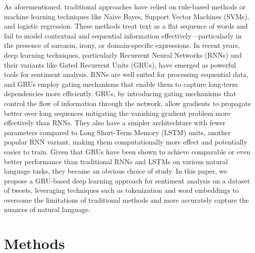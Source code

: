 \documentclass[11pt]{article}
\begin{document}
As aforementioned, traditional approaches have relied on rule-based methods or machine learning techniques like Naive Bayes, Support Vector Machines (SVMs), and logistic regression. These methods treat text as a flat sequence of words and fail to model contextual and sequential information effectively—particularly in the presence of sarcasm, irony, or domain-specific expressions. In recent years, deep learning techniques, particularly Recurrent Neural Networks (RNNs) and their variants like Gated Recurrent Units (GRUs), have emerged as powerful tools for sentiment analysis. RNNs are well suited for processing sequential data, and GRUs employ gating mechanisms that enable them to capture long-term dependencies more efficiently. GRUs, by introducing gating mechanisms that control the flow of information through the network, allow gradients to propagate better over long sequences mitigating the vanishing gradient problem more effectively than RNNs. They also have a simpler architechture with fewer parameters compared to Long Short-Term Memory (LSTM) units, another popular RNN variant, making them computationally more effect and potentially easier to train. Given that GRUs have been shown to achieve comparable or even better performance than traditional RNNs and LSTMs on various natural language tasks, they became an obvious choice of study. In this paper, we propose a GRU-based deep learning approach for sentiment analysis on a dataset of tweets, leveraging techniques such as tokenization and word embeddings to overcome the limitations of traditional methods and more accurately capture the nuances of natural language.

\section{Methods}
\end{document}
